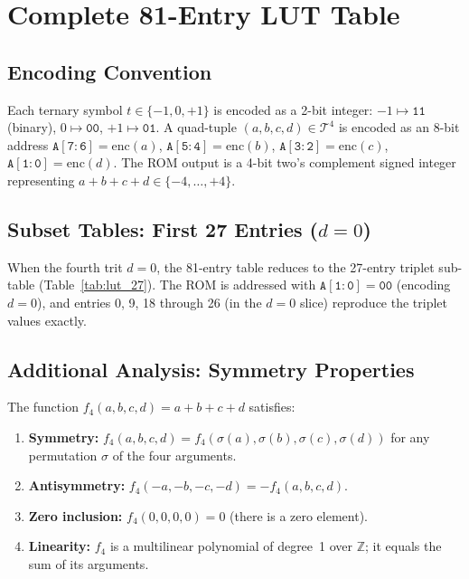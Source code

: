 \section{Complete 81-Entry LUT Table}
\label{app:lut81}

\subsection{Encoding Convention}

Each ternary symbol $t \in \{-1, 0, +1\}$ is encoded as a 2-bit integer:
$-1 \mapsto \mathtt{11}$ (binary), $0 \mapsto \mathtt{00}$, $+1 \mapsto \mathtt{01}$.
A quad-tuple $(a,b,c,d) \in \mathcal{T}^4$ is encoded as an 8-bit address
$\mathtt{A[7:6]} = \mathrm{enc}(a)$, $\mathtt{A[5:4]} = \mathrm{enc}(b)$,
$\mathtt{A[3:2]} = \mathrm{enc}(c)$, $\mathtt{A[1:0]} = \mathrm{enc}(d)$.
The ROM output is a 4-bit two's complement signed integer representing
$a + b + c + d \in \{-4,\ldots,+4\}$.

\subsection{Subset Tables: First 27 Entries ($d = 0$)}

When the fourth trit $d = 0$, the 81-entry table reduces to the 27-entry
triplet sub-table (Table~\ref{tab:lut_27}).  The ROM is addressed with
$\mathtt{A[1:0]} = \mathtt{00}$ (encoding $d = 0$), and entries 0, 9, 18 through 26
(in the $d=0$ slice) reproduce the triplet values exactly.

\subsection{Additional Analysis: Symmetry Properties}

The function $f_4(a,b,c,d) = a+b+c+d$ satisfies:

\begin{enumerate}[(P1)]
  \item \textbf{Symmetry:} $f_4(a,b,c,d) = f_4(\sigma(a),\sigma(b),\sigma(c),\sigma(d))$
    for any permutation $\sigma$ of the four arguments.
  \item \textbf{Antisymmetry:} $f_4(-a,-b,-c,-d) = -f_4(a,b,c,d)$.
  \item \textbf{Zero inclusion:} $f_4(0,0,0,0) = 0$ (there is a zero element).
  \item \textbf{Linearity:} $f_4$ is a multilinear polynomial of degree~1
    over $\mathbb{Z}$; it equals the sum of its arguments.
\end{enumerate}

